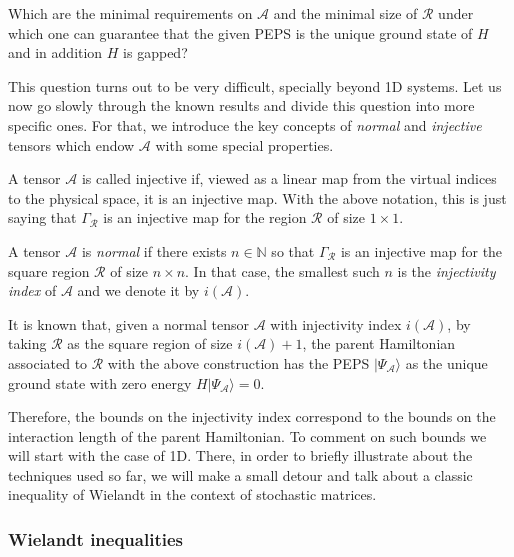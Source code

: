 \documentclass[smallextended]{svjour3}
\renewcommand{\1}{\mathbbm{1}}
\newcommand{\N}{\mathbb{N}}
\newcommand{\ket} [1] {\vert #1 \rangle}
\begin{document}
\begin{question}
    Which are the minimal requirements on $\mathcal{A}$ and the minimal size of $\mathcal{R}$ under which one can guarantee that the given PEPS is the unique ground state of $H$ and in addition $H$ is gapped?
\end{question}

This question turns out to be very difficult, specially beyond 1D systems. Let us now go slowly  through the known results and divide this question into more specific ones. For that, we introduce the key concepts of {\it normal} and {\it injective} tensors which endow $\mathcal{A}$ with some special properties.

\begin{definition}\label{def:injectivity}
    A tensor $\mathcal{A}$ is called injective if, viewed as a linear map from the virtual indices to the physical space, it is an injective map. With the above notation, this is just saying that $\Gamma_\mathcal{R}$ is an injective map for the region $\mathcal{R}$ of size $1\times 1$.
\end{definition}

\begin{definition}\label{def:normality} A tensor $\mathcal{A}$ is {\it normal} if there exists $n\in\N$ so that $\Gamma_\mathcal{R}$ is an injective map for the square region $\mathcal{R}$ of size $n\times n$. In that case, the smallest such $n$ is the {\it injectivity index} of $\mathcal{A}$ and we denote it by $i(\mathcal{A})$.
\end{definition}

It is known \cite{Fannes92,reviewPEPS} that, given a normal tensor $\mathcal{A}$ with injectivity index $i(\mathcal{A})$, by taking $\mathcal{R}$ as the square region of size $i(\mathcal{A})+1$, the parent Hamiltonian associated to $\mathcal{R}$ with the above construction has the PEPS $\ket{\Psi_\mathcal{A}}$ as the unique ground state with zero energy $H\ket{\Psi_\mathcal{A}}=0$.

Therefore, the bounds on the injectivity index correspond to the bounds on the interaction length of the parent Hamiltonian.  To comment on such bounds we will start with the case of 1D. There, in order to briefly illustrate about the techniques used so far, we will make a small detour and talk about a classic inequality of Wielandt in the context of stochastic matrices.


\subsubsection{Wielandt inequalities}
\end{document}
